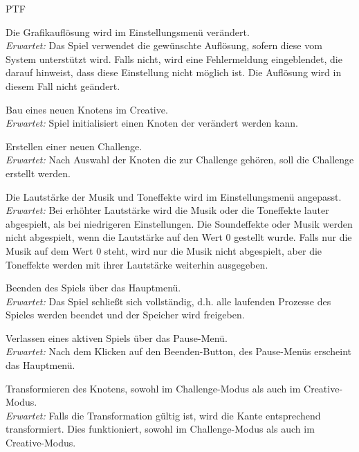 	\begin{ids}{\gls{PTF}}

		\id[ 10] Die Grafikauflösung wird im Einstellungsmenü verändert.\\
		
		\textit{Erwartet:} Das Spiel verwendet die gewünschte Auflösung, sofern diese vom System unterstützt wird. Falls nicht, wird eine Fehlermeldung eingeblendet, die darauf hinweist, dass diese Einstellung nicht möglich ist. Die Auflösung wird in diesem Fall nicht geändert.

		\id[ 20] Bau eines neuen Knotens im Creative.\\
		
		\textit{Erwartet:} Spiel initialisiert einen Knoten der verändert werden kann.

		\id[ 30] Erstellen einer neuen Challenge.\\
		
		\textit{Erwartet:} Nach Auswahl der Knoten die zur Challenge gehören, soll die Challenge erstellt werden.
		
		\id[ 40] Die Lautstärke der Musik und Toneffekte wird im Einstellungsmenü angepasst.\\ 
		
		\textit{Erwartet:} Bei erhöhter Lautstärke wird die Musik oder die Toneffekte lauter abgespielt, als bei niedrigeren Einstellungen. Die Soundeffekte oder Musik werden nicht abgespielt, wenn die Lautstärke auf den Wert 0 gestellt wurde. Falls nur die Musik auf dem Wert 0 steht, wird nur die Musik nicht abgespielt, aber die Toneffekte werden mit ihrer Lautstärke weiterhin ausgegeben.
		
		\id[ 50] Beenden des Spiels über das Hauptmenü.\\
		
		\textit{Erwartet:} Das Spiel schließt sich vollständig, d.h. alle laufenden Prozesse des Spieles werden beendet und der Speicher wird freigeben.

		\id[ 60] Verlassen eines aktiven Spiels über das Pause-Menü.\\
		
		\textit{Erwartet:} Nach dem Klicken auf den Beenden-Button, des Pause-Menüs erscheint das Hauptmenü.

		\id[70] Transformieren des Knotens, sowohl im Challenge-Modus als auch im Creative-Modus.\\
		
		\textit{Erwartet:} Falls die Transformation gültig ist, wird die Kante entsprechend transformiert. Dies funktioniert, sowohl im Challenge-Modus als auch im Creative-Modus.


\end{ids}
